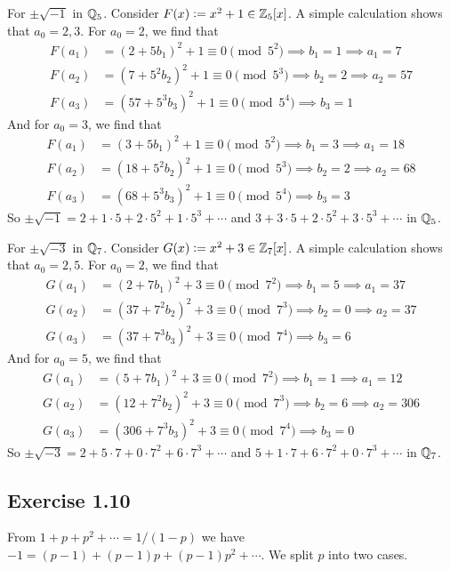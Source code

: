 \documentclass[../Koblitz.tex]{subfiles}
\begin{document}
For $\pm\sqrt{-1}$ in $\mathbb{Q}_5$. Consider $F(x):=x^2+1\in\mathbb{Z}_5[x]$. A simple calculation shows that $a_0=2,3$. For $a_0=2$, we find that
\begin{align*}
    F(a_1)&=(2+5b_1)^2+1\equiv 0\pmod{5^2} \implies b_1=1 \implies a_1=7 \\
    F(a_2)&=(7+5^2b_2)^2+1\equiv 0\pmod{5^3} \implies b_2=2 \implies a_2=57 \\
    F(a_3)&=(57+5^3b_3)^2+1\equiv 0\pmod{5^4} \implies b_3=1
\end{align*}
And for $a_0=3$, we find that
\begin{align*}
    F(a_1)&=(3+5b_1)^2+1\equiv 0\pmod{5^2} \implies b_1=3 \implies a_1=18 \\
    F(a_2)&=(18+5^2b_2)^2+1\equiv 0\pmod{5^3} \implies b_2=2 \implies a_2=68 \\
    F(a_3)&=(68+5^3b_3)^2+1\equiv 0\pmod{5^4} \implies b_3=3
\end{align*}
So $\pm\sqrt{-1}=2+1\cdot5+2\cdot5^2+1\cdot5^3+\cdots$ and $3+3\cdot5+2\cdot5^2+3\cdot5^3+\cdots$ in $\mathbb{Q}_5$.

For $\pm\sqrt{-3}$ in $\mathbb{Q}_7$. Consider $G(x):=x^2+3\in\mathbb{Z}_7[x]$. A simple calculation shows that $a_0=2,5$. For $a_0=2$, we find that
\begin{align*}
    G(a_1)&=(2+7b_1)^2+3\equiv 0\pmod{7^2} \implies b_1=5 \implies a_1=37 \\
    G(a_2)&=(37+7^2b_2)^2+3\equiv 0\pmod{7^3} \implies b_2=0 \implies a_2=37\\
    G(a_3)&=(37+7^3b_3)^2+3\equiv 0\pmod{7^4} \implies b_3=6
\end{align*}
And for $a_0=5$, we find that
\begin{align*}
    G(a_1)&=(5+7b_1)^2+3\equiv 0\pmod{7^2} \implies b_1=1 \implies a_1=12 \\
    G(a_2)&=(12+7^2b_2)^2+3\equiv 0\pmod{7^3} \implies b_2=6 \implies a_2=306 \\
    G(a_3)&=(306+7^3b_3)^2+3\equiv 0\pmod{7^4} \implies b_3=0
\end{align*}
So $\pm\sqrt{-3}=2+5\cdot7+0\cdot7^2+6\cdot7^3+\cdots$ and $5+1\cdot7+6\cdot7^2+0\cdot7^3+\cdots$ in $\mathbb{Q}_7$.

\subsection*{Exercise 1.10}

From $1+p+p^2+\cdots=1/(1-p)$ we have $-1=(p-1)+(p-1)p+(p-1)p^2+\cdots$. We split $p$ into two cases.
\end{document}

